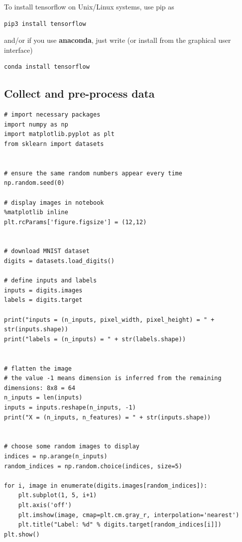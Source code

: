 \documentclass[%
oneside,                 %
final,                   %
10pt]{article}
\begin{document}
To install tensorflow on Unix/Linux systems, use pip as
\begin{verbatim}
pip3 install tensorflow
\end{verbatim}
and/or if you use \textbf{anaconda}, just write (or install from the graphical user interface)
\begin{verbatim}
conda install tensorflow
\end{verbatim}

\subsection*{Collect and pre-process data}

\begin{verbatim}
# import necessary packages
import numpy as np
import matplotlib.pyplot as plt
from sklearn import datasets


# ensure the same random numbers appear every time
np.random.seed(0)

# display images in notebook
%matplotlib inline
plt.rcParams['figure.figsize'] = (12,12)


# download MNIST dataset
digits = datasets.load_digits()

# define inputs and labels
inputs = digits.images
labels = digits.target

print("inputs = (n_inputs, pixel_width, pixel_height) = " + str(inputs.shape))
print("labels = (n_inputs) = " + str(labels.shape))


# flatten the image
# the value -1 means dimension is inferred from the remaining dimensions: 8x8 = 64
n_inputs = len(inputs)
inputs = inputs.reshape(n_inputs, -1)
print("X = (n_inputs, n_features) = " + str(inputs.shape))


# choose some random images to display
indices = np.arange(n_inputs)
random_indices = np.random.choice(indices, size=5)

for i, image in enumerate(digits.images[random_indices]):
    plt.subplot(1, 5, i+1)
    plt.axis('off')
    plt.imshow(image, cmap=plt.cm.gray_r, interpolation='nearest')
    plt.title("Label: %d" % digits.target[random_indices[i]])
plt.show()
\end{verbatim}
\end{document}
